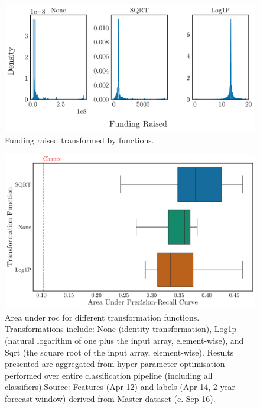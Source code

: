 \documentclass[../thesis/thesis.tex]{subfiles}
\begin{document}
\begin{figure}[!htb]
    \centering
    \includegraphics[width=\textwidth]{../figures/design/funding_transformation}
    \caption[Funding raised transformed by functions]{Funding raised transformed by functions.}
    \label{fig:design:funding_transformation}
\end{figure}

\begin{figure}[!htb]
    \centering
    \includegraphics[width=\textwidth]{../figures/design/transformer}
    \caption[Area under PR Curves by transformation function]{Area under \gls{roc} for different transformation functions. Transformations include: None (identity transformation), Log1p (natural logarithm of one plus the input array, element-wise), and Sqrt (the square root of the input array, element-wise). Results presented are aggregated from hyper-parameter optimisation performed over entire classification pipeline (including all classifiers).Source: Features (Apr-12) and labels (Apr-14, 2 year forecast window) derived from Master dataset (c. Sep-16).}
    \label{fig:design:transformer}
\end{figure}
\end{document}
